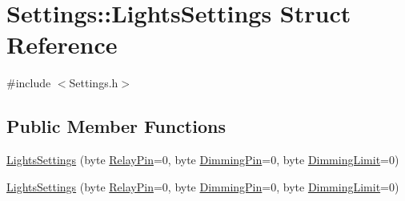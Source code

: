 \hypertarget{struct_settings_1_1_lights_settings}{}\section{Settings\+:\+:Lights\+Settings Struct Reference}
\label{struct_settings_1_1_lights_settings}


{\ttfamily \#include $<$Settings.\+h$>$}

\subsection*{Public Member Functions}
\begin{DoxyCompactItemize}
\item 
\hyperlink{struct_settings_1_1_lights_settings_a1544965041d8368ad0303a91689314af}{Lights\+Settings} (byte \hyperlink{struct_settings_1_1_lights_settings_a673a594b02bf5274e1abc73de1576fbc}{Relay\+Pin}=0, byte \hyperlink{struct_settings_1_1_lights_settings_a648257fa9fd042a9864268c00edd6e9d}{Dimming\+Pin}=0, byte \hyperlink{struct_settings_1_1_lights_settings_a6ea62bb9bdea85117c8dec9fb6ef98c8}{Dimming\+Limit}=0)
\item 
\hyperlink{struct_settings_1_1_lights_settings_a1544965041d8368ad0303a91689314af}{Lights\+Settings} (byte \hyperlink{struct_settings_1_1_lights_settings_a673a594b02bf5274e1abc73de1576fbc}{Relay\+Pin}=0, byte \hyperlink{struct_settings_1_1_lights_settings_a648257fa9fd042a9864268c00edd6e9d}{Dimming\+Pin}=0, byte \hyperlink{struct_settings_1_1_lights_settings_a6ea62bb9bdea85117c8dec9fb6ef98c8}{Dimming\+Limit}=0)
\end{DoxyCompactItemize}
